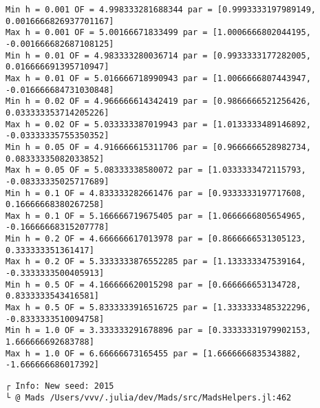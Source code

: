 \documentclass[11pt]{article}
\begin{document}
    \begin{Verbatim}[commandchars=\\\{\}]
Min h = 0.001 OF = 4.998333281688344 par = [0.9993333197989149,
0.0016666826937701167]
Max h = 0.001 OF = 5.00166671833499 par = [1.0006666802044195,
-0.001666682687108125]
Min h = 0.01 OF = 4.983333280036714 par = [0.9933333177282005,
0.016666691395710947]
Max h = 0.01 OF = 5.016666718990943 par = [1.0066666807443947,
-0.016666684731030848]
Min h = 0.02 OF = 4.966666614342419 par = [0.9866666521256426,
0.033333353714205226]
Max h = 0.02 OF = 5.033333387019943 par = [1.0133333489146892,
-0.03333335755350352]
Min h = 0.05 OF = 4.916666615311706 par = [0.9666666528982734,
0.08333335082033852]
Max h = 0.05 OF = 5.08333338580072 par = [1.0333333472115793,
-0.08333335025717689]
Min h = 0.1 OF = 4.833333282661476 par = [0.9333333197717608,
0.16666668380267258]
Max h = 0.1 OF = 5.166666719675405 par = [1.0666666805654965,
-0.16666668315207778]
Min h = 0.2 OF = 4.666666617013978 par = [0.8666666531305123, 0.333333351361417]
Max h = 0.2 OF = 5.3333333876552285 par = [1.133333347539164,
-0.3333333500405913]
Min h = 0.5 OF = 4.166666620015298 par = [0.666666653134728, 0.8333333543416581]
Max h = 0.5 OF = 5.8333333916516725 par = [1.3333333485322296,
-0.8333333510094758]
Min h = 1.0 OF = 3.333333291678896 par = [0.33333331979902153,
1.666666692683788]
Max h = 1.0 OF = 6.66666673165455 par = [1.6666666835343882, -1.666666686017392]
    \end{Verbatim}

    \begin{Verbatim}[commandchars=\\\{\}]
┌ Info: New seed: 2015
└ @ Mads /Users/vvv/.julia/dev/Mads/src/MadsHelpers.jl:462
    \end{Verbatim}
\end{document}
